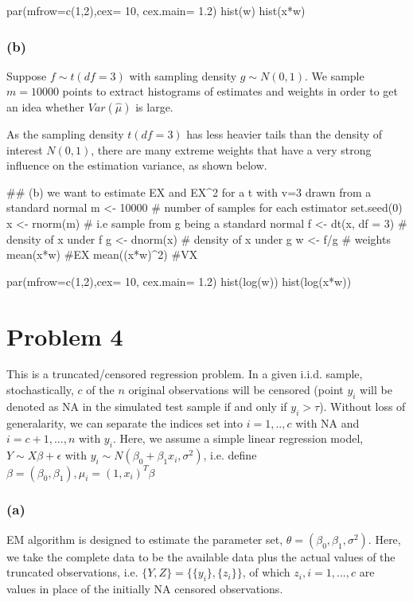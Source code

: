 \documentclass{article}
\begin{document}
par(mfrow=c(1,2),cex= 10, cex.main= 1.2)
hist(w)
hist(x*w)


\subsubsection*{(b)}
\hspace{12 pt} Suppose $f\sim t(df=3)$ with sampling density $g\sim N(0,1)$. We sample $m=10000$ points
to extract histograms of estimates and weights in order to get an idea whether $Var(\hat\mu)$ is large.

As the sampling density $t(df=3)$ has less heavier tails than the density of interest $N(0,1)$, there are
many extreme weights that have a very strong influence on the estimation variance, as shown below.


## (b) we want to estimate EX and EX^2 for a t with v=3 drawn from a standard normal
m <- 10000 # number of samples for each estimator
set.seed(0)
x <- rnorm(m)  # i.e sample from g being a standard normal
f <- dt(x, df = 3)  # density of x under f
g <- dnorm(x)  # density of x under g
w <- f/g  # weights
mean(x*w) #EX
mean((x*w)^2) #VX

par(mfrow=c(1,2),cex= 10, cex.main= 1.2)
hist(log(w))
hist(log(x*w))



\newpage
\section*{Problem 4}

\hspace{12 pt} This is a truncated/censored regression problem. In a given i.i.d. sample, stochastically, $c$ of the $n$ original observations
will be censored (point $y_i$ will be denoted as NA in the simulated test sample if and only if $y_i > \tau$). Without loss of generalarity, 
we can separate the indices set into $i=1, .., c$ with NA and $i=c+1, ..., n$ with $y_i$. 
Here, we assume a simple linear regression model, 
$Y\sim X\beta + \epsilon$ with $y_i\sim N(\beta_0+\beta_1x_i,\sigma^2)$, i.e. define $\beta=(\beta_0,\beta_1), \mu_i=(1, x_i)^T\beta$

\subsubsection*{(a)}
\hspace{12 pt} EM algorithm is designed to estimate the parameter set, $\theta = (\beta_0,\beta_1,\sigma^2)$. Here, we take the complete data to be
the available data plus the actual values of the truncated observations, i.e. $\{Y, Z\}=\{\{y_i\},\{z_i\}\}$, 
of which $z_i, i=1, ... , c$ are values in place of the initially NA censored observations. 
\end{document}
